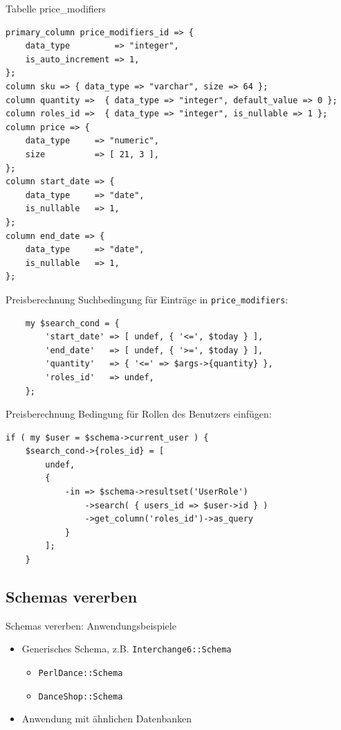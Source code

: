 \begin{frame}[fragile]{Tabelle price\_modifiers}
\begin{lstlisting}
primary_column price_modifiers_id => {
    data_type         => "integer",
    is_auto_increment => 1,
};
column sku => { data_type => "varchar", size => 64 };
column quantity =>  { data_type => "integer", default_value => 0 };
column roles_id =>  { data_type => "integer", is_nullable => 1 };
column price => {
    data_type     => "numeric",
    size          => [ 21, 3 ],
};
column start_date => {
    data_type     => "date",
    is_nullable   => 1,
};
column end_date => {
    data_type     => "date",
    is_nullable   => 1,
};
\end{lstlisting}
\end{frame}

\begin{frame}[fragile]{Preisberechnung}
Suchbedingung für Einträge in \verb|price_modifiers|:
\begin{lstlisting}
    my $search_cond = {
        'start_date' => [ undef, { '<=', $today } ],
        'end_date'   => [ undef, { '>=', $today } ],
        'quantity'   => { '<=' => $args->{quantity} },
        'roles_id'   => undef,
    };
\end{lstlisting}
\end{frame}


\begin{frame}[fragile]{Preisberechnung}
Bedingung für Rollen des Benutzers einfügen:

\begin{lstlisting}
if ( my $user = $schema->current_user ) {
    $search_cond->{roles_id} = [
        undef,
        {
            -in => $schema->resultset('UserRole')
                ->search( { users_id => $user->id } )
                ->get_column('roles_id')->as_query
            }
        ];
    }

\end{lstlisting}
\end{frame}

\subsection{Schemas vererben}

\begin{frame}[fragile]{Schemas vererben: Anwendungsbeispiele}
\begin{itemize}
\item Generisches Schema, z.B. \verb|Interchange6::Schema|
  \begin{itemize}
  \item \verb|PerlDance::Schema|
  \item \verb|DanceShop::Schema|
  \end{itemize}
\item Anwendung mit ähnlichen Datenbanken
\end{itemize}
\end{frame}


